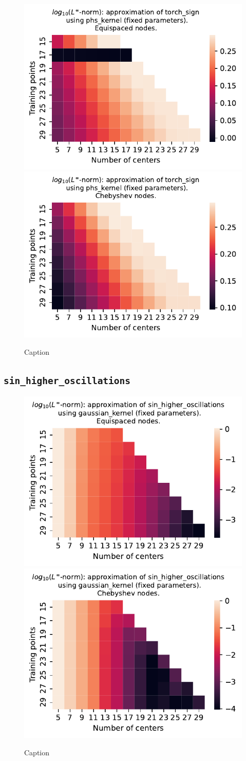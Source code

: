 \documentclass[12pt]{report} %
\begin{document}
\begin{figure}[ht]
    \centering
    \includegraphics[width=.49\textwidth]{imagenes/experiments/1d/least_squares/opt-torch_sign-Kphs_kernel-Equi.pdf}
    \includegraphics[width=.49\textwidth]{imagenes/experiments/1d/least_squares/opt-torch_sign-Kphs_kernel-Cheb.pdf}
    \caption{Caption}
    \label{fig:opt-torch-sign-phs}
\end{figure}

\subsection*{\texttt{sin\_higher\_oscillations}}

\begin{figure}[ht]
    \centering
    
    \includegraphics[width=.49\textwidth]{imagenes/experiments/1d/least_squares/opt-sin_higher_oscillations-Kgaussian_kernel-Equi.pdf}
    \includegraphics[width=.49\textwidth]{imagenes/experiments/1d/least_squares/opt-sin_higher_oscillations-Kgaussian_kernel-Cheb.pdf}
    \caption{Caption}
    \label{fig:opt-sin-higher-oscillations-gaussian}
\end{figure}
\end{document}
